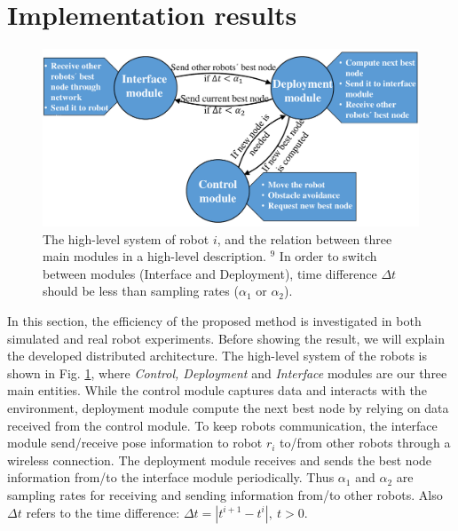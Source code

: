 \documentclass[smallcondensed]{svjour3}
\begin{document}
\section{Implementation results}
\label{sec:implementation}
%
\begin{figure}[b]
\centering
\includegraphics[width=0.993 \columnwidth]{Figures/Fig10.pdf}
\caption{The high-level system of robot $i$, and the relation between three main modules in a high-level description. {\color{blue}$^9$ In order to switch between modules (Interface and Deployment), time difference $\Delta t$ should be less than sampling rates ($\alpha_1$ or $\alpha_2$).} }
\label{fig:state}
\end{figure}
%

In this section, the efficiency of the proposed method is investigated in both simulated and real robot experiments. Before showing the result, we will explain the developed distributed architecture. The high-level system of the robots is shown in Fig. \ref{fig:state}, where \textit{Control, Deployment} and \textit{Interface} modules are our three main entities. While the control module captures data and interacts with the environment, deployment module compute the next best node by relying on data received from the control module. To keep robots communication, the interface module send/receive pose information to robot $r_i$ to/from other robots through a wireless connection. The deployment module receives and sends the best node information from/to the interface module periodically. Thus $\alpha_1$ and $\alpha_2$ are sampling rates for receiving and sending information from/to other robots. Also  $\Delta t $ refers to the time difference: $\Delta t=|t^{i+1}-t^i|,~ t>0$.
\end{document}
